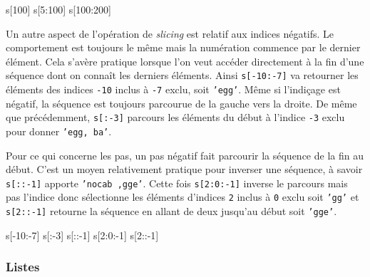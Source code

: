 \begin{idleconsole}
	\begin{pyconsole}
s[100]
s[5:100]
s[100:200]
	\end{pyconsole}
\end{idleconsole}




Un autre aspect de l'opération de \textit{slicing} est relatif aux indices négatifs. Le comportement est toujours le même mais la numération commence par le dernier élément. Cela s'avère pratique lorsque l'on veut accéder directement à la fin d'une séquence dont on connaît les derniers éléments. Ainsi \texttt{s[-10:-7]} va retourner les éléments des indices \texttt{-10} inclus à \texttt{-7} exclu, soit \texttt{'egg'}. Même si l'indiçage est négatif, la séquence est toujours parcourue de la gauche vers la droite. De même que précédemment, \texttt{s[:-3]} parcours les éléments du début à l'indice \texttt{-3} exclu pour donner \texttt{'egg, ba'}.

Pour ce qui concerne les pas, un pas négatif fait parcourir la séquence de la fin au début. C'est un moyen relativement pratique pour inverser une séquence, à savoir \texttt{s[::-1]} apporte \texttt{'nocab ,gge'}. Cette fois \texttt{s[2:0:-1]} inverse le parcours mais pas l'indice donc sélectionne les éléments d'indices \texttt{2} inclus à \texttt{0} exclu soit \texttt{'gg'} et \texttt{s[2::-1]} retourne la séquence en allant de deux jusqu'au début soit \texttt{'gge'}.

\begin{idleconsole}
	\begin{pyconsole}
s[-10:-7]
s[:-3]
s[::-1]
s[2:0:-1]
s[2::-1]
	\end{pyconsole}
\end{idleconsole}


\subsubsection[Listes]{Listes}
\label{subsub:XI.2.1.2}

